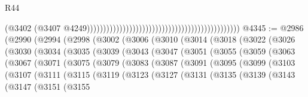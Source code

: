 \begin{lexlean}{R44}
\begin{coremodule}
{                                                                                              (@3402
                                                                                                (@3407
                                                                                                  @4249)))))))))))))))))))))))))))))))))))))))))))))))
@4345 := @2986
    (@2990
      (@2994
        (@2998
          (@3002
            (@3006
              (@3010
                (@3014
                  (@3018
                    (@3022
                      (@3026
                        (@3030
                          (@3034
                            (@3035
                              (@3039
                                (@3043
                                  (@3047
                                    (@3051
                                      (@3055
                                        (@3059
                                          (@3063
                                            (@3067
                                              (@3071
                                                (@3075
                                                  (@3079
                                                    (@3083
                                                      (@3087
                                                        (@3091
                                                          (@3095
                                                            (@3099
                                                              (@3103
                                                                (@3107
                                                                  (@3111
                                                                    (@3115
                                                                      (@3119
                                                                        (@3123
                                                                          (@3127
                                                                            (@3131
                                                                              (@3135
                                                                                (@3139
                                                                                  (@3143
                                                                                    (@3147
                                                                                      (@3151
                                                                                        (@3155
}
\end{coremodule}
\end{lexlean}
